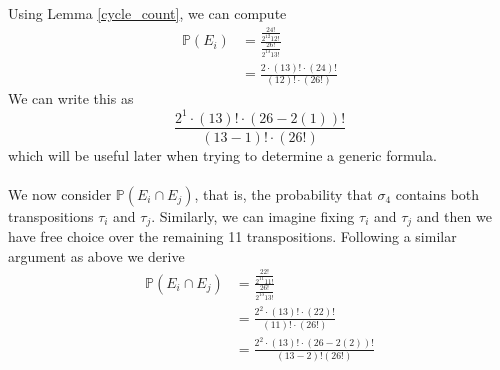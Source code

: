 \noindent Using Lemma \ref{cycle_count}, we can compute
\begin{align*}
  \mathbb{P}(E_i) & = \frac{\frac{24!}{2^{12}12!}}{\frac{26!}{2^{13}13!}} \\
  & =  \frac{2\cdot(13)!\cdot(24)!}{(12)!\cdot(26!)}
\end{align*}
We can write this as
\[
  \frac{2^1\cdot(13)!\cdot(26-2(1))!}{(13-1)!\cdot(26!)}
\]
which will be useful later when trying to determine a generic formula.
\\\\We now consider $\mathbb{P}(E_i\cap E_j)$, that is, the
probability that $\sigma_4$ contains both transpositions $\tau_i$ and
$\tau_j$. Similarly, we can imagine fixing $\tau_i$ and $\tau_j$ and
then we have free choice over the remaining 11 transpositions.
Following a similar argument as above we derive
\begin{align*}
  \mathbb{P}(E_i\cap E_j) & =
  \frac{\frac{22!}{2^{11}11!}}{\frac{26!}{2^{13}13!}}
  \\
  & =  \frac{2^2\cdot(13)!\cdot(22)!}{(11)!\cdot(26!)}  \\
  & = \frac{2^2\cdot(13)!\cdot(26-2(2))!}{(13-2)!(26!)}
\end{align*}
